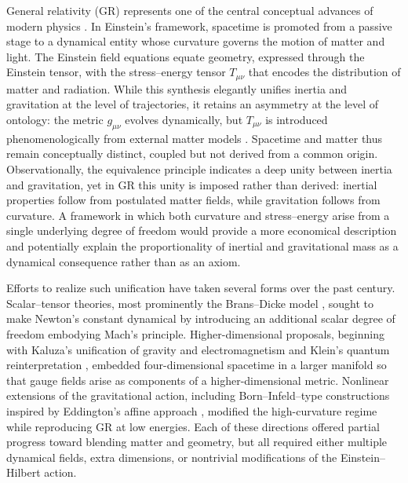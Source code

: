 \documentclass{article}
\begin{document}
General relativity (GR) represents one of the central conceptual advances of modern physics \cite{Einstein1916_GR}. In Einstein’s framework, spacetime is promoted from a passive stage to a dynamical entity whose curvature governs the motion of matter and light. The Einstein field equations equate geometry, expressed through the Einstein tensor, with the stress--energy tensor $T_{\mu\nu}$ that encodes the distribution of matter and radiation. While this synthesis elegantly unifies inertia and gravitation at the level of trajectories, it retains an asymmetry at the level of ontology: the metric $g_{\mu\nu}$ evolves dynamically, but $T_{\mu\nu}$ is introduced phenomenologically from external matter models \cite{Will2014_LivingRev}. Spacetime and matter thus remain conceptually distinct, coupled but not derived from a common origin. Observationally, the equivalence principle indicates a deep unity between inertia and gravitation, yet in GR this unity is imposed rather than derived: inertial properties follow from postulated matter fields, while gravitation follows from curvature. A framework in which both curvature and stress--energy arise from a single underlying degree of freedom would provide a more economical description and potentially explain the proportionality of inertial and gravitational mass as a dynamical consequence rather than as an axiom.

Efforts to realize such unification have taken several forms over the past century. Scalar--tensor theories, most prominently the Brans--Dicke model \cite{Brans1961}, sought to make Newton’s constant dynamical by introducing an additional scalar degree of freedom embodying Mach’s principle. Higher-dimensional proposals, beginning with Kaluza’s unification of gravity and electromagnetism \cite{Kaluza1921} and Klein’s quantum reinterpretation \cite{Klein1926}, embedded four-dimensional spacetime in a larger manifold so that gauge fields arise as components of a higher-dimensional metric. Nonlinear extensions of the gravitational action, including Born--Infeld–type constructions inspired by Eddington’s affine approach \cite{Banados2010_EiBI}, modified the high-curvature regime while reproducing GR at low energies. Each of these directions offered partial progress toward blending matter and geometry, but all required either multiple dynamical fields, extra dimensions, or nontrivial modifications of the Einstein–Hilbert action.
\end{document}
